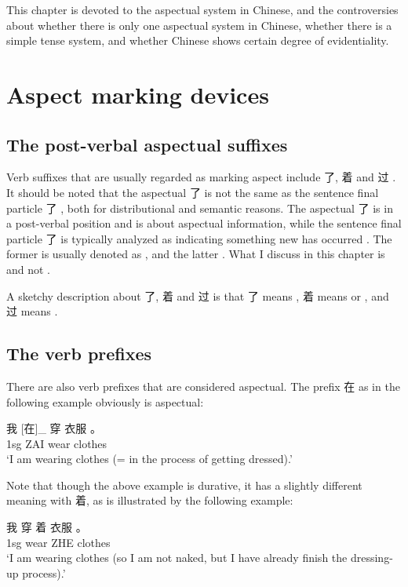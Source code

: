 This chapter is devoted to the aspectual system in Chinese, 
and the controversies about whether there is only one aspectual system in Chinese, 
whether there is a simple tense system, and whether Chinese shows certain degree of evidentiality.

\section{Aspect marking devices}\label{sec:aspect-marking-device}

\subsection{The post-verbal aspectual suffixes}\label{sec:post-verbal-aspect}

Verb suffixes that are usually regarded as marking aspect include 了, 着 and 过 . 
It should be noted that the aspectual 了 is not the same as the sentence final particle 了 , 
both for distributional and semantic reasons.
The aspectual 了 is in a post-verbal position and is about aspectual information, 
while the sentence final particle 了 is typically analyzed as indicating something new has occurred 
\citep[]{zhudexigrammar}.
The former is usually denoted as , and the latter  \citep{peng2005le12}. 
What I discuss in this chapter is  and not . 

A sketchy description about 了, 着 and 过 is that 
了 means , 着 means  or , 
and 过 means  
\cite[]{li1989mandarin}.

\subsection{The verb prefixes}\label{sec:pre-verbal-aspect}

There are also verb prefixes that are considered aspectual. 
The prefix 在 as in the following example obviously is aspectual:
\begin{exe}
    \ex \gll 我 [在]_{} 穿 衣服 。\\
    1sg ZAI wear clothes \\
    \glt `I am wearing clothes (= in the process of getting dressed).'
\end{exe} 
Note that though the above example is durative, it has a slightly different meaning with 着, 
as is illustrated by the following example: 
\begin{exe}
    \ex \gll 我 穿 着 衣服 。 \\
    1sg wear ZHE clothes \\
    \glt `I am wearing clothes (so I am not naked, but I have already finish the dressing-up process).'
\end{exe}

